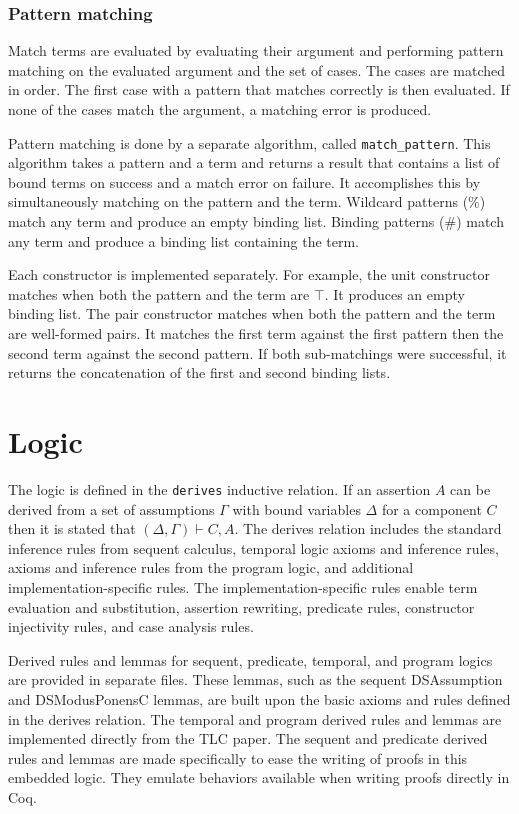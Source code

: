 \documentclass[12pt]{article}
\def\derives{\vdash}
\begin{document}
\subsubsection{Pattern matching}

Match terms are evaluated by evaluating their argument and performing
pattern matching on the evaluated argument and the set of cases.  The
cases are matched in order.  The first case with a pattern that matches
correctly is then evaluated.  If none of the cases match the argument,
a matching error is produced.

Pattern matching is done by a separate algorithm, called
\texttt{match\_pattern}.  This algorithm takes a pattern and a term and
returns a result that contains a list of bound terms on success and a
match error on failure.  It accomplishes this by simultaneously matching
on the pattern and the term.  Wildcard patterns ($\%$) match any term
and produce an empty binding list.  Binding patterns ($\#$) match any
term and produce a binding list containing the term.

Each constructor is implemented separately.  For example, the unit
constructor matches when both the pattern and the term are $\top$.  It
produces an empty binding list.  The pair constructor matches when both
the pattern and the term are well-formed pairs.  It matches the first
term against the first pattern then the second term against the second
pattern.  If both sub-matchings were successful, it returns the
concatenation of the first and second binding lists.

\section{Logic}

The logic is defined in the \texttt{derives} inductive relation.  If an
assertion $A$ can be derived from a set of assumptions $\Gamma$ with
bound variables $\Delta$ for a component $C$ then it is stated that
$(\Delta, \Gamma) \derives C, A$.  The derives relation includes the
standard inference rules from sequent calculus, temporal logic axioms
and inference rules, axioms and inference rules from the program logic,
and additional implementation-specific rules.  The
implementation-specific rules enable term evaluation and substitution,
assertion rewriting, predicate rules, constructor injectivity rules,
and case analysis rules.

Derived rules and lemmas for sequent, predicate, temporal, and program
logics are provided in separate files.  These lemmas, such as the
sequent DSAssumption and DSModusPonensC lemmas, are built upon the basic
axioms and rules defined in the derives relation.  The temporal and
program derived rules and lemmas are implemented directly from the TLC
paper.  The sequent and predicate derived rules and lemmas are made
specifically to ease the writing of proofs in this embedded logic.  They
emulate behaviors available when writing proofs directly in Coq.
\end{document}
